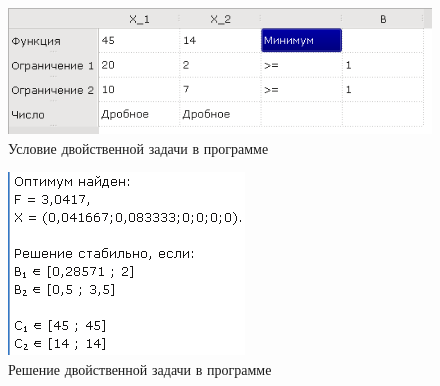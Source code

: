 \begin{figure}[ht]
\centering
\includegraphics[scale=1.0]{img/problem12.png}
\caption{Условие двойственной задачи в программе}
\end{figure}

\begin{figure}[ht]
\centering
\includegraphics[scale=1.0]{img/solution12.png}
\caption{Решение двойственной задачи в программе}
\end{figure}

\clearpage

